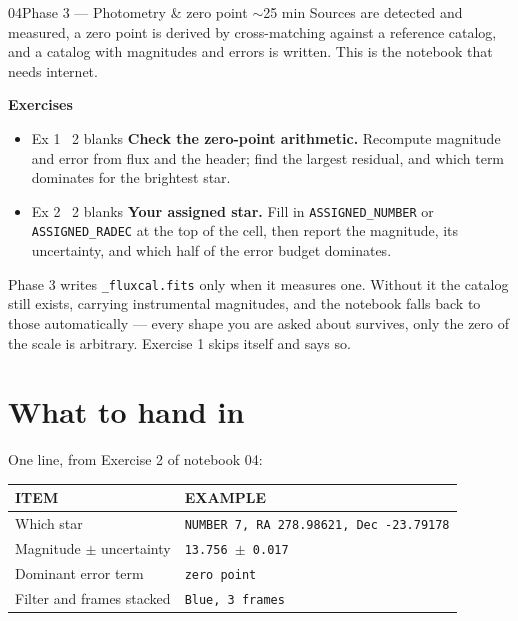 \documentclass[11pt,a4paper]{article}
\newcommand{\cm}[1]{\texttt{\small #1}}
\newcommand{\thead}[1]{{\sffamily\bfseries\scriptsize\color{inkfaint}\MakeUppercase{#1}}}
\begin{document}
\begin{nbbox}{04}{Phase 3 --- Photometry \& zero point \quad\textnormal{\sffamily\scriptsize\color{inkfaint}$\sim$25 min}}
\small\color{inksoft} Sources are detected and measured, a zero point is derived by
cross-matching against a reference catalog, and a catalog with magnitudes and errors is
written. This is the notebook that needs internet.
\par\vspace{6pt}\color{ink}
{\sffamily\bfseries\small Exercises}
\begin{itemize}
\item[] {\ttfamily\scriptsize\color{inkfaint}Ex 1 \textbullet\ 2 blanks}\quad
\textbf{Check the zero-point arithmetic.} Recompute magnitude and error from flux and the
header; find the largest residual, and which term dominates for the brightest star.
\item[] {\ttfamily\scriptsize\color{inkfaint}Ex 2 \textbullet\ 2 blanks}\quad
\textbf{Your assigned star.} Fill in \texttt{ASSIGNED\_NUMBER} or \texttt{ASSIGNED\_RADEC} at
the top of the cell, then report the magnitude, its uncertainty, and which half of the error
budget dominates.
\end{itemize}
\end{nbbox}

\begin{caution}
Phase 3 writes \cm{\_fluxcal.fits} only when it measures one. Without it the catalog still
exists, carrying instrumental magnitudes, and the notebook falls back to those automatically
--- every shape you are asked about survives, only the zero of the scale is arbitrary.
Exercise 1 skips itself and says so.
\end{caution}

\section{What to hand in}
One line, from Exercise 2 of notebook 04:

\vspace{4pt}
\begin{tabularx}{\textwidth}{@{}p{5.4cm}X@{}}
\toprule
\thead{Item} & \thead{Example} \\
\midrule
Which star & \cm{NUMBER 7, RA 278.98621, Dec -23.79178} \\
Magnitude $\pm$ uncertainty & \cm{13.756 $\pm$ 0.017} \\
Dominant error term & \cm{zero point} \\
Filter and frames stacked & \cm{Blue, 3 frames} \\
\bottomrule
\end{tabularx}
\end{document}
